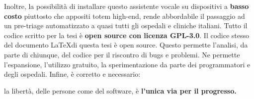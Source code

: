 Inoltre, la possibilità di installare questo assistente vocale su dispositivi a \textbf{basso costo} piuttosto che appositi totem high-end, rende abbordabile il passaggio ad un pre-triage automatizzato a quasi tutti gli ospedali e cliniche italiani.
Tutto il codice scritto per la tesi è \textbf{open source con licenza GPL-3.0}. Il codice stesso del documento \LaTeX di questa tesi è open source.
Questo permette l'analisi, da parte di chiunque, del codice per il riscontro di bugs e problemi. Ne permette l'espansione, l'utilizzo gratuito, la sperimentazione da parte dei programmatori e degli ospedali. Infine, è corretto e necessario:
\begin{center}
    la libertà, delle persone come del software, è \textbf{l'unica via per il progresso.}
\end{center}
